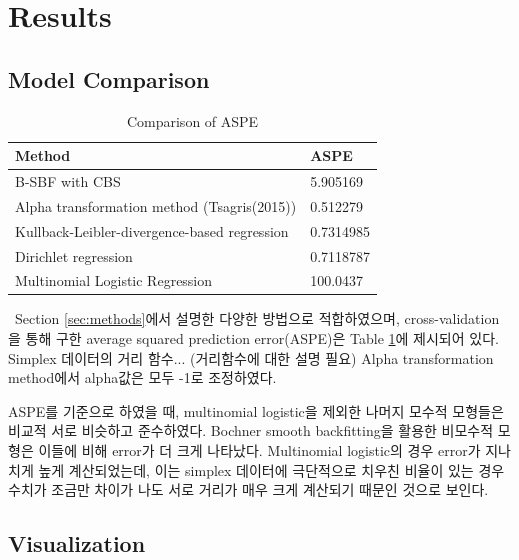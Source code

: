 \section{Results}\label{sec:results}


\subsection{Model Comparison}\label{sec:comparison}

\begin{table}[t]
	\centering
\begin{tabular}{ | p{9cm} | m{1.5cm} | } 
\hline
Method & ASPE \\
\hline
B-SBF with CBS & 5.905169 \\ 
\hline
Alpha transformation method (Tsagris(2015)) & 0.512279 \\ 
\hline
Kullback-Leibler-divergence-based regression & 0.7314985 \\
\hline
Dirichlet regression & 0.7118787 \\
\hline
Multinomial Logistic Regression & 100.0437 \\
\hline
\end{tabular}
 \caption{Comparison of ASPE}
 \label{table:1}
\end{table}

\ \quad Section \ref{sec:methods}에서 설명한 다양한 방법으로 적합하였으며, cross-validation을 통해 구한 average squared prediction error(ASPE)은 Table \ref{table:1}에 제시되어 있다. Simplex 데이터의 거리 함수... (거리함수에 대한 설명 필요) Alpha transformation method에서 alpha값은 모두 -1로 조정하였다.

ASPE를 기준으로 하였을 때, multinomial logistic을 제외한 나머지 모수적 모형들은 비교적 서로 비슷하고 준수하였다. Bochner smooth backfitting을 활용한 비모수적 모형은 이들에 비해 error가 더 크게 나타났다. Multinomial logistic의 경우 error가 지나치게 높게 계산되었는데, 이는 simplex 데이터에 극단적으로 치우친 비율이 있는 경우 수치가 조금만 차이가 나도 서로 거리가 매우 크게 계산되기 때문인 것으로 보인다.

\subsection{Visualization}\label{sec:visual}

